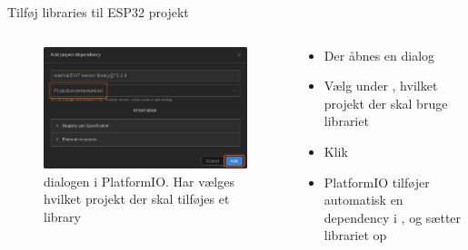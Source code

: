 \documentclass[aspectratio=169]{beamer}
\begin{document}
\begin{frame}{Tilføj libraries til ESP32 projekt}
\begin{columns}
	\begin{column}{0.5\textwidth}
		\begin{figure}
  			\includegraphics[width=\textwidth,keepaspectratio=true]{assets/pictures/pio-libraries-3.png}
  			\caption{ dialogen i PlatformIO. Har vælges hvilket projekt der skal tilføjes et library}
  			\label{fig:pio-libraries-3}
		\end{figure}
	\end{column}
	\begin{column}{0.5\textwidth}
		\begin{textBox}
			\begin{itemize}
				\item Der åbnes en  dialog
				\item Vælg under , hvilket projekt der skal bruge librariet
				\item Klik 
				\item PlatformIO tilføjer automatisk en  dependency i , og sætter librariet op
			\end{itemize}
		\end{textBox}
	\end{column}
\end{columns}
\end{frame}
\end{document}
